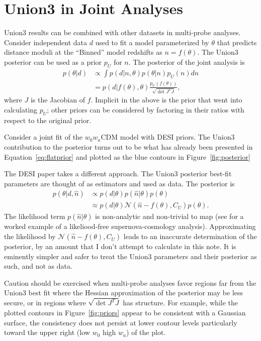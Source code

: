\documentclass[11pt,a4paper]{article}
\begin{document}
\section{Union3 in Joint Analyses}
\label{sec:joint}
Union3 results can be combined with other datasets in multi-probe analyses.
Consider independent data $d$ used to fit a model parameterized by $\theta$
that predicts distance moduli at the ``Binned'' model redshifts as $n=f(\theta)$.
The Union3 posterior can be used as a prior $p_U$ for $n$.  The posterior of the joint analysis is
\begin{align}
p(\theta|d) &\propto \int  p(d|n,\theta)p(\theta|n)p_U(n) dn\\
&=  p(d|f(\theta),\theta) \frac{p_U(f(\theta))} {\sqrt{\det{J^TJ}}}, \label{eq:correct}
\end{align}
where $J$ is the Jacobian of $f$.
Implicit in the above is the prior
that went into calculating $p_U$; other priors can be considered by factoring in their ratios with respect to the 
original prior.

Consider a joint fit of the  $w_0w_a$CDM model with DESI priors.  The Union3 contribution to the posterior turns out to be
what has already been presented in 
Equation~\ref{eq:flatprior} and plotted as the blue contours in
Figure~\ref{fig:posterior} 

The DESI paper takes a different approach.  The Union3 posterior best-fit parameters are thought of as estimators and used as
 data.  The posterior is
\begin{align}
p(\theta | d, \hat{n}) & \propto p(d| \theta) p( \hat{n}| \theta) p(\theta) \\
& \approx p(d| \theta) \mathcal{N}( \hat{n}-f(\theta) , C_U) p(\theta) \label{eq:DESI}.
\end{align}
The  likelihood
 term $ p( \hat{n}| \theta)$ is non-analytic and non-trivial to map
(see \cite{2013ApJ...764..116W} for a worked example of a likeliood-free supernova-cosmology analysis).
Approximating the likelihood
by $\mathcal{N}( \hat{n}-f(\theta) , C_U)$ leads to an inaccurate determination
of the posterior, by an amount that I don't attempt to calculate in this note.
It is eminently simpler and safer to treat the Union3 parameters and their posterior as such, and not as data.

Caution should be exercised when multi-probe analyses favor regions far from the Union3 best fit  where the Hessian approximation of the
posterior may be less secure, or in regions where $\sqrt{\det{J^TJ}}$ has structure.  For example, while the plotted contours in Figure~\ref{fig:priors}
appear to be consistent with a Gaussian surface, the consistency does not persist at lower contour levels particularly toward the upper right (low $w_0$ high $w_a$) of the plot.
\end{document}
